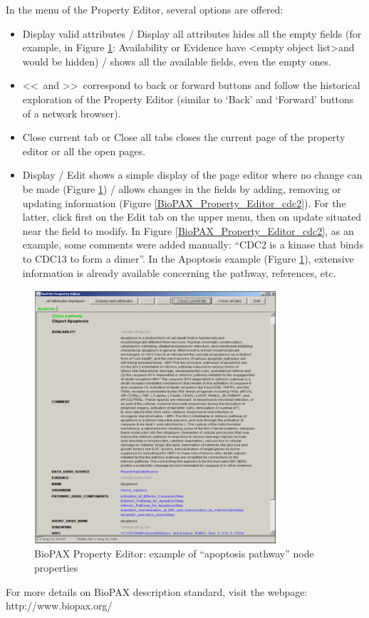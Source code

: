 \parbox{\textwidth}{ In the menu of the Property Editor, several options are
offered:

\begin{itemize}
\item Display valid attributes / Display all attributes hides all the empty
fields (for example, in Figure \ref{BioPAX_Property_Editor_apoptosis}:
Availability or Evidence have \textless empty object list\textgreater and would
be hidden) / shows all the available fields, even the empty ones.
\item  \textless\textless~and \textgreater\textgreater~correspond to back or
forward buttons and follow the historical exploration of the Property Editor
(similar to ‘Back’ and ‘Forward’ buttons of a network browser).
\item Close current tab or Close all tabs closes the current page of the
property editor or all the open pages.
\item  Display / Edit shows a simple display of the page editor where no change
can be made (Figure \ref{BioPAX_Property_Editor_apoptosis}) / allows changes in
the fields by adding, removing or updating information (Figure
\ref{BioPAX_Property_Editor_cdc2}). For the latter, click first on the Edit tab
on the upper menu, then on update situated near the field to modify. In Figure
\ref{BioPAX_Property_Editor_cdc2}, as an example, some comments were added
manually: “CDC2 is a kinase that binds to CDC13 to form a dimer”. In the
Apoptosis example (Figure \ref{BioPAX_Property_Editor_apoptosis}), extensive
information is already available concerning the pathway, references, etc.
\end{itemize}}
\begin{figure}[h]
\centering
\includegraphics[width=0.8\textwidth]{graphics/BioPAX_Property_Editor_apoptosis}
\caption{BioPAX Property Editor: example of “apoptosis pathway” node properties}
\label{BioPAX_Property_Editor_apoptosis}
\end{figure}	
For more details on BioPAX description standard, visit the webpage:
http://www.biopax.org/ 
